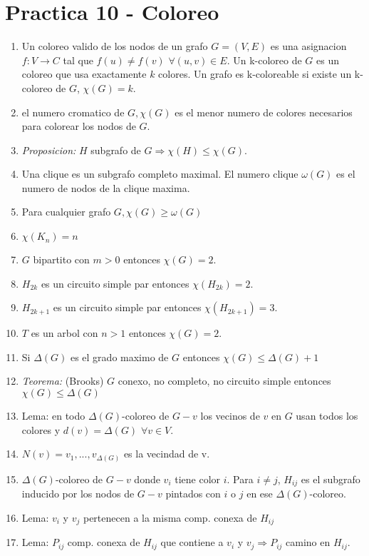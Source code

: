 \section{Practica 10 - Coloreo}
\begin{enumerate}
\item Un coloreo valido de los nodos de un grafo $G=(V,E)$ es una asignacion $f:V\rightarrow C$ tal que $f(u) \neq f(v)$ $\forall(u,v)\in E$. Un k-coloreo de $G$ es un coloreo que usa exactamente $k$ colores. Un grafo es k-coloreable si existe un k-coloreo de $G$, $\chi(G)=k$.
\item el numero cromatico de $G, \chi(G)$ es el menor numero de colores necesarios para colorear los nodos de $G$.
\item \textit{Proposicion:} $H$ subgrafo de $G \Rightarrow \chi(H) \leq \chi(G)$.
\item Una clique es un subgrafo completo maximal. El numero clique $\omega(G)$ es el numero de nodos de la clique maxima.
\item Para cualquier grafo $G, \chi(G) \geq \omega(G)$
\item $\chi(K_{n}) = n$
\item $G$ bipartito con $m>0$ entonces $\chi(G) = 2$.
\item $H_{2k}$ es un circuito simple par entonces $\chi(H_{2k}) = 2$.
\item $H_{2k+1}$ es un circuito simple par entonces $\chi(H_{2k+1}) = 3$.
\item $T$ es un arbol con $n>1$ entonces $\chi(G) = 2$.
\item Si $\Delta(G)$ es el grado maximo de $G$ entonces $\chi(G) \leq \Delta(G)+1$
\item \textit{Teorema:} (Brooks) $G$ conexo, no completo, no circuito simple entonces $\chi(G) \leq \Delta(G)$
\item Lema: en todo $\Delta(G)$-coloreo de $G-{v}$ los vecinos de $v$ en $G$ usan todos los colores y $d(v) = \Delta(G)$ $\forall v \in V$.
\item $N(v)={v_{1},...,v_{\Delta(G)}}$ es la vecindad de v.
\item $\Delta(G)$-coloreo de $G-{v}$ donde $v_{i}$ tiene color $i$. Para $i \neq j$, $H_{ij}$ es el subgrafo inducido por los nodos de $G-{v}$ pintados con $i$ o $j$ en ese $\Delta(G)$-coloreo.
\item Lema: $v_{i}$ y $v_{j}$ pertenecen a la misma comp. conexa de $H_{ij}$
\item Lema: $P_{ij}$ comp. conexa de $H_{ij}$ que contiene a $v_{i}$ y $v_{j} \Rightarrow P_{ij}$ camino en $H_{ij}$.

\end{enumerate}
